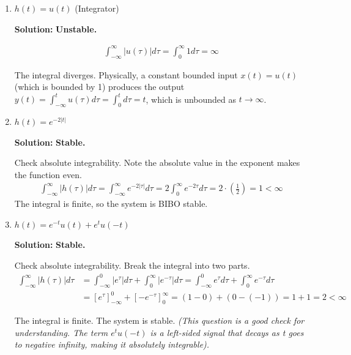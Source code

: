 \documentclass[nohyper,nobib,xcolor=dvipsnames,svgnames,x11names]{tufte-book}
\newenvironment{multiequation}{%
  \setlength{\abovedisplayskip}{3pt}      %
  \setlength{\belowdisplayskip}{6pt}      %
  \setlength{\abovedisplayshortskip}{3pt} %
  \setlength{\belowdisplayshortskip}{6pt} %
  \begin{equation}%
    \begin{aligned}%
}{%
    \end{aligned}%
  \end{equation}%
}
\begin{document}
\begin{enumerate}
\begin{enumerate}
The system is stable.

\item $ h(t) = u(t) $ (Integrator) 

\textbf{Solution:} \textbf{Unstable.} 

\begin{multiequation}
\int_{-\infty}^{\infty} |u(\tau)|  d\tau = \int_{0}^{\infty} 1  d\tau = \infty
\end{multiequation}

The integral diverges. Physically, a constant bounded input $ x(t) = u(t) $ (which is bounded by 1) produces the output $ y(t) = \int_{-\infty}^{t} u(\tau)d\tau = \int_{0}^{t} d\tau = t $, which is unbounded as $ t \to \infty $.

\item $ h(t) = e^{-2|t|} $ 

\textbf{Solution:} \textbf{Stable.} 

Check absolute integrability. Note the absolute value in the exponent makes the function even.
\begin{multiequation}
\int_{-\infty}^{\infty} |h(\tau)|  d\tau = \int_{-\infty}^{\infty} e^{-2|\tau|}  d\tau = 2 \int_{0}^{\infty} e^{-2\tau}  d\tau = 2 \cdot \left( \frac{1}{2} \right) = 1 < \infty
\end{multiequation}
The integral is finite, so the system is BIBO stable.

\item $ h(t) = e^{-t} u(t) + e^{t} u(-t) $

\textbf{Solution:} \textbf{Stable.} 

Check absolute integrability. Break the integral into two parts.
\begin{multiequation}
\int_{-\infty}^{\infty} |h(\tau)|  d\tau & = \int_{-\infty}^{0} |e^{\tau}|  d\tau + \int_{0}^{\infty} |e^{-\tau}|  d\tau = \int_{-\infty}^{0} e^{\tau}  d\tau + \int_{0}^{\infty} e^{-\tau}  d\tau \\
& = \left[ e^{\tau} \right]_{-\infty}^{0} + \left[ -e^{-\tau} \right]_{0}^{\infty} = (1 - 0) + (0 - (-1)) = 1 + 1 = 2 < \infty
\end{multiequation}

The integral is finite. The system is stable. \textit{(This question is a good check for understanding. The term $ e^{t}u(-t) $ is a left-sided signal that decays as t goes to negative infinity, making it absolutely integrable).}


\end{enumerate}


\end{enumerate}
\end{document}
